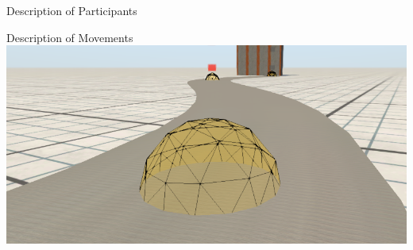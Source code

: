 \documentclass[aspectratio=169]{beamer}
\begin{document}
\begin{frame}{Description of Participants}
\end{frame}

\begin{frame}{Description of Movements}
    \centering
    \includegraphics[width=\linewidth]{media/waypoints.png}
\end{frame}
\end{document}
